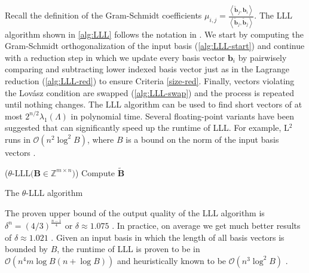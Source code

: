 Recall the definition of the Gram-Schmidt coefficients $\mu_{i, j} = \frac{\left\langle \tilde{\mathbf{b}}_j, \mathbf{b}_i\right\rangle}{\left\langle \tilde{\mathbf{b}}_j, \tilde{\mathbf{b}}_j\right\rangle}$. The LLL algorithm shown in \cref{alg:LLL} follows the notation in \cite{LLLReg04}. We start by computing the Gram-Schmidt orthogonalization of the input basis (\cref{alg:LLL-start}) and continue with a reduction step in which we update every basis vector $\mathbf{b}_i$ by pairwisely comparing and subtracting lower indexed basis vector just as in the Lagrange reduction (\cref{alg:LLL-red}) to ensure Criteria \ref{size-red}. Finally, vectors violating the Lovász condition are swapped (\cref{alg:LLL-swap}) and the process is repeated until nothing changes. The LLL algorithm can be used to find short vectors of at most $2^{n/2} \lambda_1(\Lambda)$ in polynomial time. Several floating-point variants have been suggested that can significantly speed up the runtime of LLL. For example, L$^2$ runs in $\mathcal{O}(n^2 \log^2 B)$, where $B$ is a bound on the norm of the input basis vectors \cite{NS05}. %

\begin{algorithm2e}
  \Begin($\theta\text{-LLL} {(}\mathbf{B} \in \mathbb{Z}^{m\times n} {)}$) %
  {
    Compute $\tilde{\mathbf{B}}$\label{alg:LLL-start}\\
  }
  \caption{The $\theta$-LLL algorithm \cite{LLL82}} \label{alg:LLL}
\end{algorithm2e}


The proven upper bound of the output quality of the LLL algorithm is $\delta^n = \left(4/3\right)^{\frac{n-1}{4}}$ or $\delta \approx 1.075$ \cite{LLL82}. In practice, on average we get much better results of $\delta \approx 1.021$ \cite{Chen13}. Given an input basis in which the length of all basis vectors is bounded by $B$, the runtime of LLL is proven to be in $\mathcal{O}\left(n^4m\log B(n+\log B)\right)$ \cite{NS05} and heuristically known to be $\mathcal{O}\left(n^{3}\log^2 B\right)$ \cite{APS15}.



